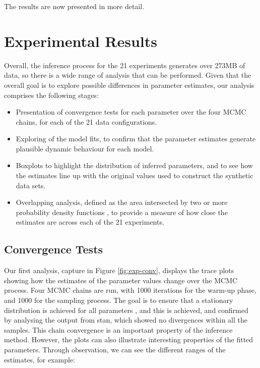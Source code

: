\documentclass[10pt,letterpaper]{article}
\begin{document}
The results are now presented in more detail.

\hypertarget{experimental-results}{%
\section{Experimental Results}\label{experimental-results}}

Overall, the inference process for the 21 experiments generates over 273MB of data, so there is a wide range of analysis that can be performed. Given that the overall goal is to explore possible differences in parameter estimates, our analysis comprises the following stages:

\begin{itemize}
\item
  Presentation of convergence tests for each parameter over the four MCMC chains, for each of the 21 data configurations.
\item
  Exploring of the model fits, to confirm that the parameter estimates generate plausible dynamic behaviour for each model.
\item
  Boxplots to highlight the distribution of inferred parameters, and to see how the estimates line up with the original values used to construct the synthetic data sets.
\item
  Overlapping analysis, defined as the area intersected by two or more probability density functions \citep{Pastore2018, 10.3389/fpsyg.2019.01089}, to provide a measure of how close the estimates are across each of the 21 experiments.
\end{itemize}

\hypertarget{convergence-tests}{%
\subsection{Convergence Tests}\label{convergence-tests}}

Our first analysis, capture in Figure \ref{fig:exp-conv}, displays the trace plots showing how the estimates of the parameter values change over the MCMC process. Four MCMC chains are run, with 1000 iterations for the warm-up phase, and 1000 for the sampling process. The goal is to ensure that a stationary distribution is achieved for all parameters \citep{https://doi.org/10.1002/sdr.1693}, and this is achieved, and confirmed by analysing the output from stan, which showed no divergences within all the samples. This chain convergence is an important property of the inference method. However, the plots can also illustrate interesting properties of the fitted parameters. Through observation, we can see the different ranges of the estimates, for example:
\end{document}
